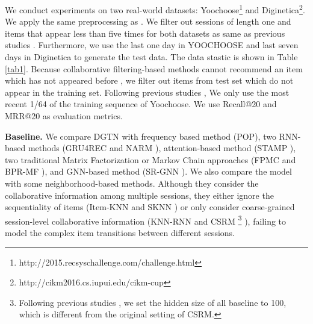 \documentclass[conference]{IEEEtran}
\begin{document}
We conduct experiments on two real-world datasets: Yoochoose\footnote{http://2015.recsyschallenge.com/challenge.html} and Diginetica\footnote{http://cikm2016.cs.iupui.edu/cikm-cup}. 
We apply the same preprocessing as \cite{liu2018stamp, wu2019srgnn}.
We filter out sessions of length one and items that appear less than five times for both datasets as same as previous studies \cite{liu2018stamp, wu2019srgnn}. Furthermore, we use the last one day in YOOCHOOSE and last seven days in Diginetica to generate the test data. The data stastic is shown in Table \ref{tab1}. Because collaborative filtering-based methods cannot recommend an item which has not appeared before \cite{hidasi2015session}, we filter out items from test set which do not appear in the training set. Following previous studies \cite{liu2018stamp, wu2019srgnn}, We only use the most recent 1/64 of the training sequence of Yoochoose. We use Recall@20 and MRR@20 as evaluation metrics. 







\textbf{Baseline. }
We compare DGTN with frequency based method (POP), two RNN-based methods (GRU4REC \cite{hidasi2015session} and NARM \cite{li2017neural}), attention-based method (STAMP \cite{liu2018stamp}), two traditional Matrix Factorization or Markov Chain approaches (FPMC \cite{rendle2010factorizing} and BPR-MF \cite{rendle2009bpr}), and GNN-based method (SR-GNN \cite{wu2019srgnn}). We also compare the model with some neighborhood-based methods. Although they consider the collaborative information among multiple sessions, they either ignore the sequentiality of items (Item-KNN \cite{sarwar2001item} and SKNN \cite{bonnin2014sknn}) or only consider coarse-grained session-level collaborative information (KNN-RNN \cite{jannach2017recurrent} and CSRM \footnote{Following previous studies \cite{liu2018stamp, wu2019srgnn}, we set the hidden size of all baseline to 100, which is different from the original setting of CSRM.} \cite{wang2019CSRM}), failing to model the complex item transitions between different sessions.
\end{document}
